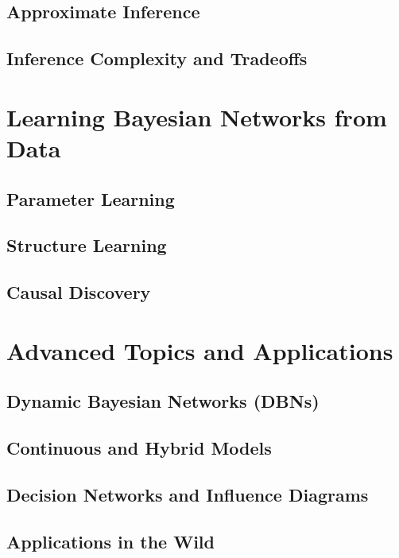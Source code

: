 \documentclass[12pt]{book}
\begin{document}
\chapter{Approximate Inference}
\chapter{Inference Complexity and Tradeoffs}

\part{Learning Bayesian Networks from Data}
\chapter{Parameter Learning}
\chapter{Structure Learning}
\chapter{Causal Discovery}

\part{Advanced Topics and Applications}
\chapter{Dynamic Bayesian Networks (DBNs)}
\chapter{Continuous and Hybrid Models}
\chapter{Decision Networks and Influence Diagrams}
\chapter{Applications in the Wild}

\backmatter
\end{document}
